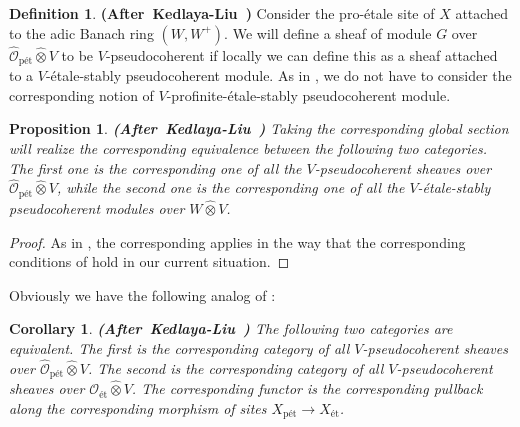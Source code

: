 \documentclass[12pt]{amsart}
\newtheorem{proposition}[theorem]{Proposition}
\newtheorem{corollary}[theorem]{Corollary}
\theoremstyle{definition}
\newtheorem{definition}[theorem]{Definition}
\numberwithin{equation}{section}
\begin{document}
\begin{definition}\mbox{\bf{(After Kedlaya-Liu \cite[Definition 3.4.7]{KL2})}} 
Consider the pro-\'etale site of $X$ attached to the adic Banach ring $(W,W^+)$. We will define a sheaf of module $G$ over $\widehat{\mathcal{O}}_\text{p\'et}\widehat{\otimes}V$ to be $V$-pseudocoherent if locally we can define this as a sheaf attached to a $V$-\'etale-stably pseudocoherent module. As in \cite[Definition 3.4.7]{KL2}, we do not have to consider the corresponding notion of $V$-profinite-\'etale-stably pseudocoherent module.	
\end{definition}




\begin{proposition}\mbox{\bf{(After Kedlaya-Liu \cite[Theorem 3.4.8]{KL2})}} \label{proposition2.10}
Taking the corresponding global section will realize the corresponding equivalence between the following two categories. The first one is the corresponding one of all the $V$-pseudocoherent sheaves over $\widehat{\mathcal{O}}_\text{p\'et}\widehat{\otimes}V$, while the second one is the corresponding one of all the $V$-\'etale-stably pseudocoherent modules over $W\widehat{\otimes}V$.
	
\end{proposition}


\begin{proof}
As in \cite[Theorem 3.4.8]{KL2}, the corresponding \cite[Proposition 9.2.6]{KL1} applies in the way that the corresponding conditions of \cite[Proposition 9.2.6]{KL1} hold in our current situation.	
\end{proof}




\indent Obviously we have the following analog of \cite[Corollary 3.4.9]{KL2}:




\begin{corollary} \mbox{\bf{(After Kedlaya-Liu \cite[Corollary 3.4.9]{KL2})}}
The following two categories are equivalent. The first is the corresponding category of all $V$-pseudocoherent sheaves over $\widehat{\mathcal{O}}_\text{p\'et}\widehat{\otimes}V$. The second is the corresponding category of all $V$-pseudocoherent sheaves over ${\mathcal{O}}_\text{\'et}\widehat{\otimes}V$. The corresponding functor is the corresponding pullback along the corresponding morphism of sites $X_{\text{p\'et}}\rightarrow X_{\text{\'et}}$. 	
\end{corollary}
\end{document}
